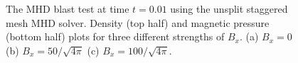\begin{figure}[!ht]
\begin{center}
\caption{
 The MHD blast test at time $t=0.01$ using the unsplit staggered mesh MHD solver. 
 Density (top half) and magnetic pressure (bottom half) plots for three different strengths of 
 $B_x$. (a) $B_x = 0$ (b) $B_x=50/\sqrt{4\pi}$ (c) $B_x=100/\sqrt{4\pi}$. 
}\label{BlastBS3D}
\end{center} 
\end{figure}


